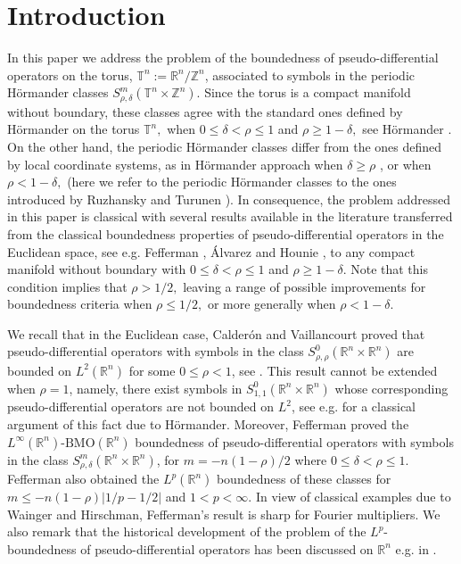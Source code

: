 \documentclass[12pt, reqno]{amsart}
\theoremstyle{definition}
\theoremstyle{remark}
\numberwithin{equation}{section}
\begin{document}
\maketitle
\tableofcontents
\allowdisplaybreaks

\section{Introduction} In this paper we address the problem of the boundedness of pseudo-differential operators on the torus, $\mathbb{T}^n := \mathbb{R}^n/\mathbb{Z}^n$, associated to symbols in the periodic H\"ormander classes $S^m_{\rho,\delta}(\mathbb{T}^n\times \mathbb{Z}^n )$. Since the torus is a compact manifold without boundary, these classes agree with the standard ones defined by H\"ormander on the torus $\mathbb{T}^n,$ when $0\leq \delta<\rho\leq 1$ and $\rho\geq 
1-\delta,$ see Hörmander \cite{hormander}. On the other hand, the periodic H\"ormander classes differ from the ones defined by local coordinate systems, as in H\"ormander approach when $\delta\geq \rho$ , or when $\rho<1-\delta,$ (here we refer to the periodic H\"ormander classes to the ones introduced by Ruzhansky and Turunen \cite[Chapter~4]{ruzhansky-turunen}).  In consequence, the problem addressed in this paper is classical with several results available in the literature transferred from the classical boundedness properties of pseudo-differential operators in the Euclidean space, see e.g. Fefferman \cite{fefferman-Lp}, \'Alvarez and Hounie \cite{alvarez-hounie}, to any compact manifold without boundary with $0\leq \delta<\rho\leq 1$ and $\rho\geq 1-\delta.$ Note that this condition implies that $\rho>1/2,$ leaving a range of possible improvements for boundedness criteria when $\rho\leq 1/2,$ or more generally when $\rho<1-\delta.$



We recall that in the Euclidean case, Calder\'on and Vaillancourt proved that pseudo-differential operators with symbols in the class $S^{0}_{\rho,\rho}(\mathbb{R}^n\times\mathbb{R}^n)$ are bounded on $L^2(\mathbb{R}^n)$ for some $0\leq\rho<1$, see \cite{calderon-vaillancourt-1, calderon-vaillancourt-2}. This result cannot be extended when $\rho=1$, namely, there exist symbols in $S^{0}_{1,1}(\mathbb{R}^n\times\mathbb{R}^n)$ whose corresponding pseudo-differential operators are not bounded on $L^2$, see e.g. \cite{duoandikoetxea} for a classical argument of this fact due to H\"ormander. Moreover, Fefferman \cite{fefferman-Lp} proved the $L^\infty(\mathbb{R}^n)$-$\mathrm{BMO}(\mathbb{R}^n)$ boundedness of pseudo-differential operators with symbols in the class $S^{m}_{\rho,\delta}(\mathbb{R}^n\times\mathbb{R}^n)$, for $m=-n(1-\rho)/2$ where $0\leq \delta<\rho\leq 1$. Fefferman also obtained the $L^p(\mathbb{R}^n)$ boundedness of these classes for $m\leq -n(1-\rho)|1/p - 1/2|$ and $1<p<\infty$. In view of classical examples due to Wainger and Hirschman, Fefferman's result is sharp for Fourier multipliers. We also remark that the historical development of the problem of the $L^p$-boundedness of pseudo-differential operators has been discussed on  $\mathbb{R}^n$ e.g. in \cite{nagase, wang}.
\end{document}
